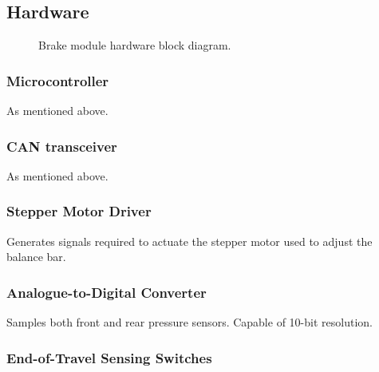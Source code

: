 \subsection{Hardware}

\begin{figure}
\centering

\caption{Brake module hardware block diagram.}
\label{fig:pneumatics_design}
\end{figure}


\subsubsection{Microcontroller}

As mentioned above.


\subsubsection{CAN transceiver}

As mentioned above.


\subsubsection{Stepper Motor Driver}

Generates signals required to actuate the stepper motor used to adjust
the balance bar.


\subsubsection{Analogue-to-Digital Converter}

Samples both front and rear pressure sensors. Capable of 10-bit resolution.


\subsubsection{End-of-Travel Sensing Switches}
